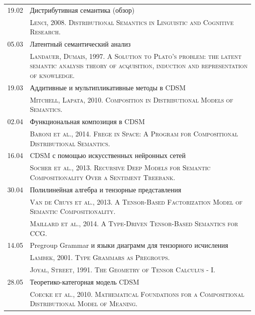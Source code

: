 \documentclass[12pt]{article}
\begin{document}
\begin{table}[h!]
\begin{tabularx}{\textwidth}{cX}
19.02 & Дистрибутивная семантика (обзор) \bigstrut[t] \\
      & {\scriptsize \textsc{Lenci, 2008. Distributional Semantics in Linguistic and Cognitive Research.}}  \bigstrut[b] \\
05.03 & Латентный семантический анализ  \bigstrut[t] \\
      & {\scriptsize \textsc{Landauer, Dumais, 1997. A Solution to Plato's problem: the latent semantic analysis theory of acquisition, induction and representation of knowledge.}}  \bigstrut[b] \\
19.03 & Аддитивные и мультипликативные методы в CDSM \bigstrut[t] \\
      & {\scriptsize \textsc{Mitchell, Lapata, 2010. Composition in Distributional Models of Semantics.}} \bigstrut[b] \\
02.04 & Функциональная композиция в CDSM \bigstrut[t] \\
      & {\scriptsize \textsc{Baroni et al., 2014. Frege in Space: A Program for Compositional Distributional Semantics.}}                \bigstrut[b] \\
16.04 & CDSM с помощью искусственных нейронных сетей \bigstrut[t] \\
      & {\scriptsize \textsc{Socher et al., 2013. Recursive Deep Models for Semantic Compositionality Over a Sentiment Treebank.}} \bigstrut[b] \\
30.04 & Полилинейная алгебра и тензорные представления \bigstrut[t] \\
      & {\scriptsize \textsc{Van de Cruys et al., 2013. A Tensor-Based Factorization Model of Semantic Compositionality.}}\\
      & {\scriptsize \textsc{Maillard et al., 2014. A Type-Driven Tensor-Based Semantics for CCG.}} \bigstrut[b] \\
14.05 & Pregroup Grammar и языки диаграмм для тензорного исчисления \bigstrut[t] \\
      & {\scriptsize \textsc{Lambek, 2001. Type Grammars as Pregroups.}}  \\
      & {\scriptsize \textsc{Joyal, Street, 1991. The Geometry of Tensor Calculus - I.}} \bigstrut[b] \\
28.05 & Теоретико-категорная модель CDSM \bigstrut[t] \\ 
      & {\scriptsize \textsc{Coecke et al., 2010. Mathematical Foundations for a Compositional Distributional Model of Meaning.}} \bigstrut[b] \\ 
\end{tabularx}
\end{table}
\end{document}
